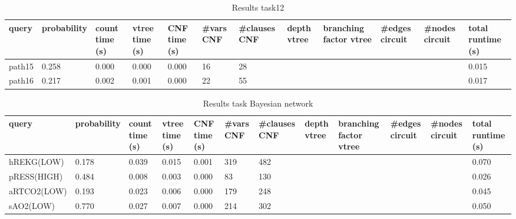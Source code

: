 \begin{table}[h]
\centering
\caption{Results task12}
\label{table:results-task12}
\begin{tabular}{l|l|l|l|l|l|l|l|l|l|l|l}
\textbf{query} & \textbf{probability} & \textbf{count time (s)} & \textbf{vtree time (s)} & \textbf{CNF time (s)} & \textbf{\#vars CNF} & \textbf{\#clauses CNF} & \textbf{depth vtree} & \textbf{branching factor vtree} & \textbf{\#edges circuit} & \textbf{\#nodes circuit} & \textbf{total runtime (s)} \\ \hline
path15 &  0.258  & 0.000 & 0.000 & 0.000 & 16 & 28 &  &  &  &   &  0.015 \\
path16 & 0.217 &  0.002  & 0.001 & 0.000 & 22 & 55 &  &  &  &   &  0.017
\end{tabular}
\end{table}


\begin{table}[h]
\centering
\caption{Results task Bayesian network}
\label{table:results-bayesian}
\begin{tabular}{l|l|l|l|l|l|l|l|l|l|l|l}
\textbf{query} & \textbf{probability} & \textbf{count time (s)} & \textbf{vtree time (s)} & \textbf{CNF time (s)} & \textbf{\#vars CNF} & \textbf{\#clauses CNF} & \textbf{depth vtree} & \textbf{branching factor vtree} & \textbf{\#edges circuit} & \textbf{\#nodes circuit} & \textbf{total runtime (s)} \\ \hline
hREKG(LOW) & 0.178  &  0.039  & 0.015  & 0.001  & 319 & 482      &   &   &    &     & 0.070  \\
pRESS(HIGH) &  0.484  &  0.008  & 0.003 & 0.000  & 83 & 130  &  &   &       &    &   0.026 \\
aRTCO2(LOW) &  0.193 &  0.023 & 0.006 & 0.000  & 179 & 248 &  &  &  &  & 0.045  \\
sAO2(LOW) & 0.770  & 0.027 & 0.007 & 0.000 & 214 & 302 &   &  &  &  &  0.050
\end{tabular}
\end{table}

